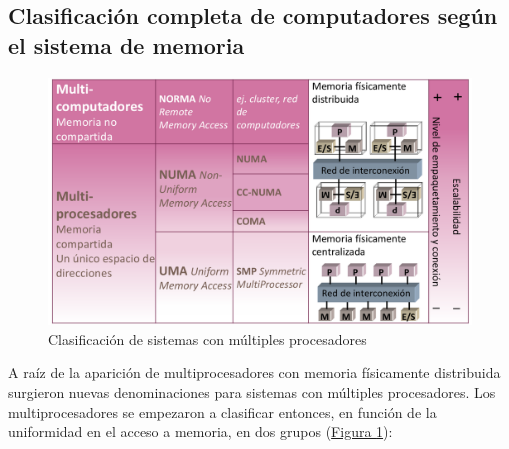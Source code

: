 \documentclass[10pt,a4paper,spanish]{report}
\begin{document}
\textcolor[rgb]{0.2,0.4,0.8}{\subsection{Clasificación completa de computadores según el sistema de memoria}}
\label{clasif_memoria}
\begin{figure}[!h]
\centering
\includegraphics[width=1\textwidth]{20}
\caption{Clasificación de sistemas con múltiples procesadores}
\label{clasificacion_multip}
\end{figure}

A raíz de la aparición de multiprocesadores con memoria físicamente distribuida surgieron nuevas denominaciones para sistemas con múltiples procesadores. Los multiprocesadores se empezaron a clasificar entonces, en función de la uniformidad en el acceso a memoria, en dos grupos (\hyperref[clasificacion_multip]{Figura \ref*{clasificacion_multip}}):
\end{document}
